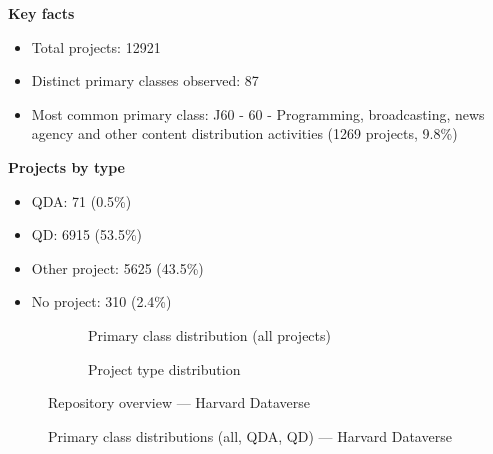 \textbf{Key facts}

\begin{itemize}
    \item Total projects: 12921
    \item Distinct primary classes observed: 87
    \item Most common primary class: J60 - 60 - Programming, broadcasting, news agency and other content distribution activities (1269 projects, 9.8\%)
\end{itemize}

\textbf{Projects by type}

\begin{itemize}
    \item QDA: 71 (0.5\%)
    \item QD: 6915 (53.5\%)
    \item Other project: 5625 (43.5\%)
    \item No project: 310 (2.4\%)
\end{itemize}

\begin{figure}[H]
    \centering
    \begin{subfigure}[t]{0.49\textwidth}
        \centering
        
        \caption{Primary class distribution (all projects)}
    \end{subfigure}
    \hfill
    \begin{subfigure}[t]{0.49\textwidth}
        \centering
        
        \caption{Project type distribution}
    \end{subfigure}
    \caption{Repository overview --- Harvard Dataverse}
\end{figure}

\clearpage

\begin{figure}[H]
    \centering
    
    \par\vspace{0.8em}
    
    \par\vspace{0.8em}
    
    \caption{Primary class distributions (all, QDA, QD) --- Harvard Dataverse}
\end{figure}


